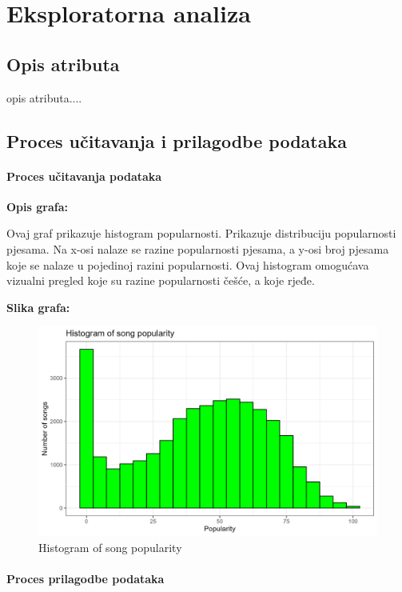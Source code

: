 \chapter{Eksploratorna analiza}

\section{Opis atributa}
opis atributa....

\section{Proces učitavanja i prilagodbe podataka}

	\subsubsection{Proces učitavanja podataka}
	
	\textbf{Opis grafa:}
	
	Ovaj graf prikazuje histogram popularnosti. Prikazuje distribuciju popularnosti pjesama. Na x-osi nalaze se razine popularnosti pjesama, a y-osi broj pjesama koje se nalaze u pojedinoj razini popularnosti.
	Ovaj histogram omogućava vizualni pregled koje su razine popularnosti češće, a koje rjeđe. 
	
	\textbf{Slika grafa:}
	\begin{figure}[H]
		\includegraphics[scale=0.9]{slike/Histogram of song popularity.png}
		\centering
		\caption{Histogram of song popularity}
		
	\end{figure}
	
	\subsubsection{Proces prilagodbe podataka}
	
